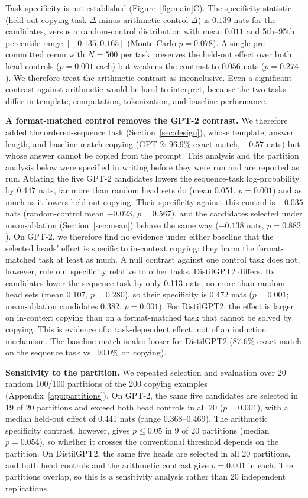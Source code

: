 \documentclass{article}
\begin{document}
Task specificity is not established (Figure~\ref{fig:main}C). The
specificity statistic (held-out copying-task $\Delta$ minus
arithmetic-control $\Delta$) is $0.139$ nats for the candidates, versus a
random-control distribution with mean $0.011$ and 5th--95th percentile
range $[-0.135,0.165]$ (Monte Carlo $p=0.078$). A single pre-committed
rerun with $N=500$ per task preserves the held-out effect over both head
controls ($p=0.001$ each) but weakens the contrast to $0.056$ nats
($p=0.274$). We therefore treat the arithmetic contrast as inconclusive.
Even a significant contrast against arithmetic would be hard to
interpret, because the two tasks differ in template, computation,
tokenization, and baseline performance.

\textbf{A format-matched control removes the GPT-2 contrast.} We
therefore added the ordered-sequence task (Section~\ref{sec:design}),
whose template, answer length, and baseline match copying (GPT-2: 96.9\%
exact match, $-0.57$ nats) but whose answer cannot be copied from the
prompt. This analysis and the partition analysis below were specified
in writing before they were run and are reported as run. Ablating the
five GPT-2 candidates lowers the sequence-task log-probability by 0.447
nats, far more than random head sets do (mean 0.051, $p=0.001$) and as
much as it lowers held-out copying. Their specificity against this
control is $-0.035$ nats (random-control mean $-0.023$, $p=0.567$), and
the candidates selected under mean-ablation (Section~\ref{sec:mean})
behave the same way ($-0.138$ nats, $p=0.882$). On GPT-2, we therefore find no evidence
under either baseline that the selected heads' effect is specific to
in-context copying: they harm the format-matched task at least as much.
A null contrast against one control task does not, however, rule out
specificity relative to other tasks.
DistilGPT2 differs. Its candidates lower the sequence task by only 0.113
nats, no more than random head sets (mean 0.107, $p=0.280$), so their
specificity is 0.472 nats ($p=0.001$; mean-ablation candidates 0.382,
$p=0.001$). For DistilGPT2, the effect is larger on in-context copying
than on a format-matched task that cannot be solved by copying. This is
evidence of a task-dependent effect, not of an induction mechanism. The
baseline match is also looser for DistilGPT2 (87.6\% exact match on the
sequence task vs.\ 90.0\% on copying).

\textbf{Sensitivity to the partition.} We repeated selection and
evaluation over 20 random 100/100 partitions of the 200 copying examples
(Appendix~\ref{app:partitions}). On GPT-2, the same five candidates are
selected in 19 of 20 partitions and exceed both head controls in all 20
($p=0.001$), with a median held-out effect of 0.441 nats (range
0.368--0.469). The arithmetic specificity contrast, however, gives
$p\le0.05$ in 9 of 20 partitions (median $p=0.054$), so whether it
crosses the conventional threshold depends on the partition. On
DistilGPT2, the same five heads are selected in all 20 partitions, and
both head controls and the arithmetic contrast give $p=0.001$ in each.
The partitions overlap, so this is a sensitivity analysis rather than 20
independent replications.
\end{document}
